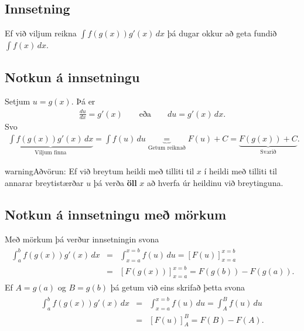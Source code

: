 \documentclass[a4paper,10pt,icelandic]{sphinxmanual}
\begin{document}
\subsection{Innsetning}
\label{kafli06:index-9}\label{kafli06:innsetning}
Ef við viljum reikna \(\int f(g(x))g'(x)\, dx\) þá dugar okkur að
geta fundið \(\int f(x)\, dx\).


\subsection{Notkun á innsetningu}
\label{kafli06:notkun-a-innsetningu}
Setjum \(u=g(x)\). Þá er
\begin{equation*}
\begin{split}\frac{du}{dx}=g'(x)\qquad \text{eða} \qquad du=g'(x)\,dx.\end{split}
\end{equation*}
Svo
\begin{equation*}
\begin{split}\underbrace{\int f(g(x))g'(x)\,dx}_{\text{Viljum finna}}  =
\int f(u)\,du
\underbrace{=}_{\text{Getum reiknað}} F(u)+C  =
\underbrace{F(g(x))+C}_{\text{Svarið}}.\end{split}
\end{equation*}
\begin{notice}{warning}{Aðvörun:}
Ef við breytum heildi með tilliti til \(x\) í heildi með tilliti til
annarar breytistærðar \(u\) þá verða \textbf{öll} \(x\) að hverfa úr
heildinu við breytinguna.
\end{notice}


\subsection{Notkun á innsetningu með mörkum}
\label{kafli06:notkun-a-innsetningu-me-morkum}
Með mörkum þá verður innsetningin svona
\begin{equation*}
\begin{split}\begin{aligned}
  \int_a^b f(g(x))g'(x)\, dx  &=&
  \int_{x=a}^{x=b} f(u)\, du  =
  [F(u)]_{x=a}^{x=b}    \\ &=&
  [F(g(x))]_{x=a}^{x=b}     =
  F(g(b)) - F(g(a)).\end{aligned}\end{split}
\end{equation*}
Ef \(A=g(a)\) og \(B=g(b)\) þá getum við eins skrifað þetta
svona
\begin{equation*}
\begin{split}\begin{aligned}
\int_a^b f(g(x))g'(x)\, dx  &=&
\int_{x=a}^{x=b} f(u)\, du  =
\int_{A}^{B} f(u)\, du    \\ &=&
[F(u)]_A^B      =
F(B) - F(A).\end{aligned}\end{split}
\end{equation*}
\end{document}
